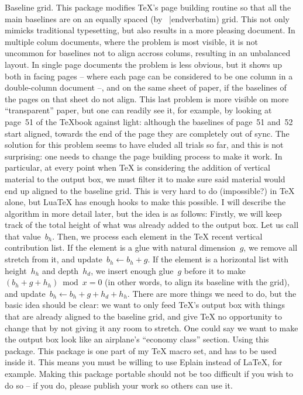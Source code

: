 
\let\ifpdf\relax

\newbox\cctanglebox
{}Baseline grid.
This package modifies \TeX{}'s page building routine so that all the
main baselines are on an equally spaced (by \hbox{\verbatim
\baselineskip|endverbatim}{}) grid.
This not only mimicks traditional typesetting, but also results
in a more pleasing document.
\unorderedlist
\li In multiple colum documents, where the problem is most visible,
it is not uncommon for baselines not
to align accross colums, resulting in an unbalanced layout.
\li In single page documents the problem is less obvious, but it
shows up both in facing pages -- where each page can be considered
to be one column in a double-column document --, and on the same
sheet of paper, if the baselines of the pages on that sheet do not align.
This last problem is more visible on more ``transparent'' paper, but
one can readily see it, for example, by looking at page~51 of the \TeX{}book
against light: although the baselines of page~51 and~52 start aligned,
towards the end of the page they are completely out of sync.
\endunorderedlist
{}The solution for this problem seems to have eluded all trials so far,
and this is not surprising: one needs to change the page building process
to make it work. In particular, at every point when \TeX{} is considering
the addition of vertical material to the output box, we must filter it to
make sure said material would end up aligned to the baseline grid. This is
very hard to do (impossible?) in \TeX{} alone, but Lua\TeX{} has
enough hooks to make this possible.
I will
describe the algorithm in more detail later, but the idea is as follows:
Firstly, we will keep track of the total height of what was already
added to the output box. Let us call that value~$b_h$.
Then, we process each element in the \TeX{} recent
vertical contribution list.
\unorderedlist
\li If the element is a glue with natural dimension~$g$, we remove all stretch
from it, and update~$b_h\leftarrow b_h+g$.
\li If the element is a horizontal list with height~$h_h$ and depth~$h_d$, we
insert enough glue~$g$ before it to make $(b_h + g + h_h)\bmod x=0$ (in other
words, to align its baseline with the grid), and update~$b_h\leftarrow b_h + g + h_d + h_h$.
\endunorderedlist
There are more things we need to do, but the basic idea should be clear:
we want to only feed \TeX's output box with things that are already aligned
to the baseline grid, and give \TeX{} no opportunity to change that by not
giving it any room to stretch. One could say we want to make the output
box look like an airplane's ``economy class'' section.
Using this package.
This package is one part of my \TeX{} macro set, and has to be used inside it.
This means you must be willing to use Eplain instead of \LaTeX, for example.
Making this package portable should not be too difficult if you wish to do so
-- if you do, please publish your work so others can use it.

